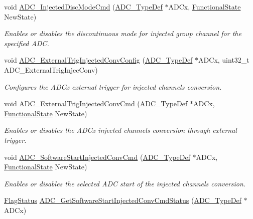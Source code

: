 \begin{DoxyCompactItemize}
void \hyperlink{group___a_d_c___private___functions_ga0b583b94183fa4ff287177b9ee808092}{A\+D\+C\+\_\+\+Injected\+Disc\+Mode\+Cmd} (\hyperlink{struct_a_d_c___type_def}{A\+D\+C\+\_\+\+Type\+Def} $\ast$A\+D\+Cx, \hyperlink{group___exported__types_gac9a7e9a35d2513ec15c3b537aaa4fba1}{Functional\+State} New\+State)
\begin{DoxyCompactList}\small\item\em Enables or disables the discontinuous mode for injected group channel for the specified A\+DC. \end{DoxyCompactList}\item 
void \hyperlink{group___a_d_c___private___functions_gafc02ce1e84e96b692adf085f61a0bca6}{A\+D\+C\+\_\+\+External\+Trig\+Injected\+Conv\+Config} (\hyperlink{struct_a_d_c___type_def}{A\+D\+C\+\_\+\+Type\+Def} $\ast$A\+D\+Cx, uint32\+\_\+t A\+D\+C\+\_\+\+External\+Trig\+Injec\+Conv)
\begin{DoxyCompactList}\small\item\em Configures the A\+D\+Cx external trigger for injected channels conversion. \end{DoxyCompactList}\item 
void \hyperlink{group___a_d_c___private___functions_gad81d134c083d8f407c819e6f4722d553}{A\+D\+C\+\_\+\+External\+Trig\+Injected\+Conv\+Cmd} (\hyperlink{struct_a_d_c___type_def}{A\+D\+C\+\_\+\+Type\+Def} $\ast$A\+D\+Cx, \hyperlink{group___exported__types_gac9a7e9a35d2513ec15c3b537aaa4fba1}{Functional\+State} New\+State)
\begin{DoxyCompactList}\small\item\em Enables or disables the A\+D\+Cx injected channels conversion through external trigger. \end{DoxyCompactList}\item 
void \hyperlink{group___a_d_c___private___functions_ga5b141d5dbf5f417a11dfa622c8c149d3}{A\+D\+C\+\_\+\+Software\+Start\+Injected\+Conv\+Cmd} (\hyperlink{struct_a_d_c___type_def}{A\+D\+C\+\_\+\+Type\+Def} $\ast$A\+D\+Cx, \hyperlink{group___exported__types_gac9a7e9a35d2513ec15c3b537aaa4fba1}{Functional\+State} New\+State)
\begin{DoxyCompactList}\small\item\em Enables or disables the selected A\+DC start of the injected channels conversion. \end{DoxyCompactList}\item 
\hyperlink{group___exported__types_ga89136caac2e14c55151f527ac02daaff}{Flag\+Status} \hyperlink{group___a_d_c___private___functions_ga8765f8835b8cfed13dce3d8d71767dcc}{A\+D\+C\+\_\+\+Get\+Software\+Start\+Injected\+Conv\+Cmd\+Status} (\hyperlink{struct_a_d_c___type_def}{A\+D\+C\+\_\+\+Type\+Def} $\ast$A\+D\+Cx)

\end{DoxyCompactItemize}

